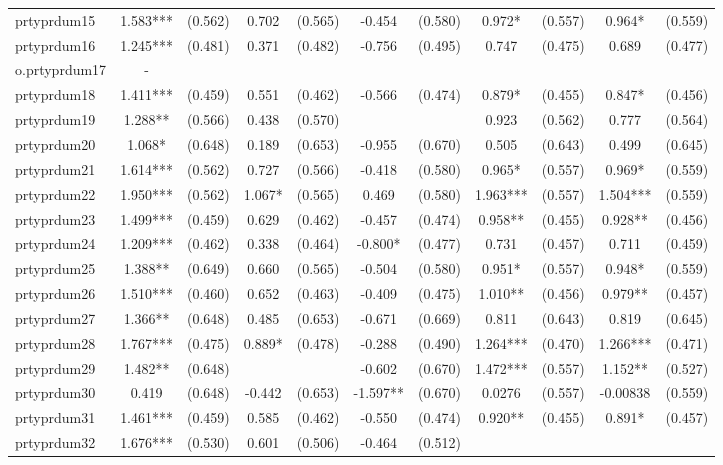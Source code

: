 \documentclass[]{article}
\begin{document}
\begin{tabular}{lcccccccccc}
prtyprdum15 & 1.583*** & (0.562) & 0.702 & (0.565) & -0.454 & (0.580) & 0.972* & (0.557) & 0.964* & (0.559) \\
prtyprdum16 & 1.245*** & (0.481) & 0.371 & (0.482) & -0.756 & (0.495) & 0.747 & (0.475) & 0.689 & (0.477) \\
o.prtyprdum17 & - &  &  &  &  &  &  &  &  &  \\
prtyprdum18 & 1.411*** & (0.459) & 0.551 & (0.462) & -0.566 & (0.474) & 0.879* & (0.455) & 0.847* & (0.456) \\
prtyprdum19 & 1.288** & (0.566) & 0.438 & (0.570) &  &  & 0.923 & (0.562) & 0.777 & (0.564) \\
prtyprdum20 & 1.068* & (0.648) & 0.189 & (0.653) & -0.955 & (0.670) & 0.505 & (0.643) & 0.499 & (0.645) \\
prtyprdum21 & 1.614*** & (0.562) & 0.727 & (0.566) & -0.418 & (0.580) & 0.965* & (0.557) & 0.969* & (0.559) \\
prtyprdum22 & 1.950*** & (0.562) & 1.067* & (0.565) & 0.469 & (0.580) & 1.963*** & (0.557) & 1.504*** & (0.559) \\
prtyprdum23 & 1.499*** & (0.459) & 0.629 & (0.462) & -0.457 & (0.474) & 0.958** & (0.455) & 0.928** & (0.456) \\
prtyprdum24 & 1.209*** & (0.462) & 0.338 & (0.464) & -0.800* & (0.477) & 0.731 & (0.457) & 0.711 & (0.459) \\
prtyprdum25 & 1.388** & (0.649) & 0.660 & (0.565) & -0.504 & (0.580) & 0.951* & (0.557) & 0.948* & (0.559) \\
prtyprdum26 & 1.510*** & (0.460) & 0.652 & (0.463) & -0.409 & (0.475) & 1.010** & (0.456) & 0.979** & (0.457) \\
prtyprdum27 & 1.366** & (0.648) & 0.485 & (0.653) & -0.671 & (0.669) & 0.811 & (0.643) & 0.819 & (0.645) \\
prtyprdum28 & 1.767*** & (0.475) & 0.889* & (0.478) & -0.288 & (0.490) & 1.264*** & (0.470) & 1.266*** & (0.471) \\
prtyprdum29 & 1.482** & (0.648) &  &  & -0.602 & (0.670) & 1.472*** & (0.557) & 1.152** & (0.527) \\
prtyprdum30 & 0.419 & (0.648) & -0.442 & (0.653) & -1.597** & (0.670) & 0.0276 & (0.557) & -0.00838 & (0.559) \\
prtyprdum31 & 1.461*** & (0.459) & 0.585 & (0.462) & -0.550 & (0.474) & 0.920** & (0.455) & 0.891* & (0.457) \\
prtyprdum32 & 1.676*** & (0.530) & 0.601 & (0.506) & -0.464 & (0.512) &  &  &  &  \\

\end{tabular}
\end{document}
